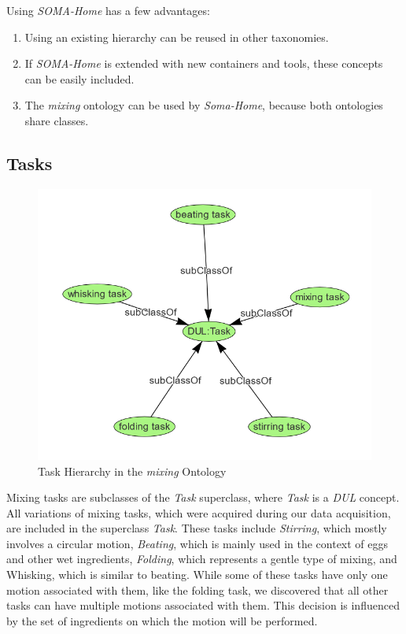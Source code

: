 Using \textit{SOMA-Home} has a few advantages:
\begin{enumerate}
    \item Using an existing hierarchy can be reused in other taxonomies.
    \item If \textit{SOMA-Home} is extended with new containers and tools, these concepts can be easily included.
    \item The \textit{mixing} ontology can be used by \textit{Soma-Home}, because both ontologies share classes.
\end{enumerate}

\subsection{Tasks}

\begin{figure}[H]
    \includegraphics[scale=0.45]{Graphics/classHierarchy/task_hierarchy.png}
    \centering
    \caption{Task Hierarchy in the \textit{mixing} Ontology}
\end{figure}

Mixing tasks are subclasses of the \textit{Task} superclass, where \textit{Task} is a \textit{DUL} concept. 
All variations of mixing tasks, which were acquired during our data acquisition, are included in the superclass \textit{Task}. 
These tasks include \textit{Stirring}, which mostly involves a circular motion, \textit{Beating}, which is mainly used in the context of eggs and other wet ingredients, 
\textit{Folding}, which represents a gentle type of mixing, and Whisking, which is similar to beating. 
While some of these tasks have only one motion associated with them, like the folding task, 
we discovered that all other tasks can have multiple motions associated with them. 
This decision is influenced by the set of ingredients on which the motion will be performed.

